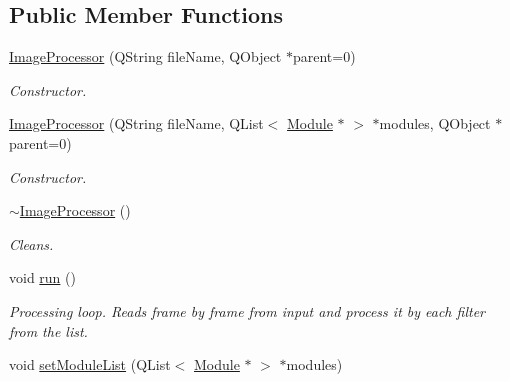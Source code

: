 \subsection*{Public Member Functions}
\begin{DoxyCompactItemize}
\item 
\hyperlink{class_image_processor_aa97d442bc538f7a8d468c5c7b8c2e899}{ImageProcessor} (QString fileName, QObject $\ast$parent=0)
\begin{DoxyCompactList}\small\item\em Constructor. \item\end{DoxyCompactList}\item 
\hyperlink{class_image_processor_aef473a32dfa762f21c325706da7e4341}{ImageProcessor} (QString fileName, QList$<$ \hyperlink{class_module}{Module} $\ast$ $>$ $\ast$modules, QObject $\ast$parent=0)
\begin{DoxyCompactList}\small\item\em Constructor. \item\end{DoxyCompactList}\item 
\hypertarget{class_image_processor_a2ff83cf5f0986ed04b7799499fe0defc}{
\hyperlink{class_image_processor_a2ff83cf5f0986ed04b7799499fe0defc}{$\sim$ImageProcessor} ()}
\label{de/d7d/class_image_processor_a2ff83cf5f0986ed04b7799499fe0defc}

\begin{DoxyCompactList}\small\item\em Cleans. \item\end{DoxyCompactList}\item 
\hypertarget{class_image_processor_a2f7b0040d90bda19ae2f0393fbe59abd}{
void \hyperlink{class_image_processor_a2f7b0040d90bda19ae2f0393fbe59abd}{run} ()}
\label{de/d7d/class_image_processor_a2f7b0040d90bda19ae2f0393fbe59abd}

\begin{DoxyCompactList}\small\item\em Processing loop. Reads frame by frame from input and process it by each filter from the list. \item\end{DoxyCompactList}\item 
\hypertarget{class_image_processor_a1b0cb82d35114ea1d9a4f7a0965fa285}{
void \hyperlink{class_image_processor_a1b0cb82d35114ea1d9a4f7a0965fa285}{setModuleList} (QList$<$ \hyperlink{class_module}{Module} $\ast$ $>$ $\ast$modules)}
\label{de/d7d/class_image_processor_a1b0cb82d35114ea1d9a4f7a0965fa285}


\end{DoxyCompactItemize}
